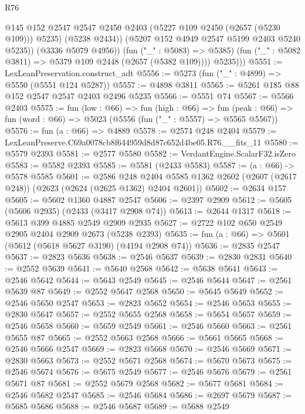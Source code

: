 \begin{lexlean}{R76}
\begin{coremodule}
                    @145
                    @152
                    @2547
                    @2547
                    @2450
                    @2403
                    (@5227 @109 @2450 (@2657 (@5230 @109)))
                    @5235)
                  (@5238 @2434))
                (@5207 @152 @4949 @2547 @5199 @2403 @5240 @5235))
              (@3336 @5079 @4956))
            (fun ("_" : @5083) => @5385)
            (fun ("_" : @5082 @3811) => @5379 @109 @2448 (@2657 (@5382 @109))))
          @5235)))
@5551 := LexLeanPreservation.construct_adt
@5556 := @5273 (fun ("_" : @4899) => @5550 (@5551 @124 @5287))
@5557 := @4898 @3811
@5565 := @5261 @185 @88 @152 @2547 @2547 @2403 @2496 @5235
@5566 := @5551 @74
@5567 := @5566 @2403
@5575 := fun (low : @66) =>
  fun (high : @66) =>
  fun (peak : @66) => fun (word : @66) => @5023 (@5556 (fun ("_" : @5557) => @5565 @5567))
@5576 := fun (a : @66) => @4889
@5578 := @2574 @248 @2404
@5579 := LexLeanPreserve.C69a0078cb8f644959d8d87c652d4be05.R76.__fits_11
@5580 := @5579 @2393
@5581 := @2577 @5580
@5582 := VerdantEngine.ScalarF32.isZero
@5583 := @5582 @2393
@5585 := @5581 (@2433 @5583)
@5587 := (a : @66) -> @5578 @5585
@5601 := @2586
    @248
    @2404
    @5585
    @1362
    @2602
    (@2607 (@2617 @248))
    (@2623 (@2624 (@2625 @1362) @2404 @2601))
@5602 := @2634 @157
@5605 := @5602 @1360 @4887 @2547
@5606 := @2397 @2909
@5612 := @5605 (@5606 @2935) (@2433 (@3417 @2908 @74))
@5613 := @2644 @1317
@5618 := @5613 @399 @4885 @2549 @2909 @2935
@5627 := @2722 @102 @650 @2549 @2905 @2404 @2909 @2673 (@5238 @2393)
@5635 := fun (a : @66) => @5601 (@5612 (@5618 @5627 @3190) (@4194 @2908 @74))
@5636 := @2835 @2547
@5637 := @2823 @5636
@5638 := @2546 @5637
@5639 := @2830 @2831
@5640 := @2552 @5639
@5641 := @5640 @2568
@5642 := @5638 @5641
@5643 := @2546 @5642
@5644 := @5643 @2549
@5645 := @2546 @5644
@5647 := @2561 @5639 @87
@5649 := @2552 @5647 @2568
@5650 := @5645 @5649
@5652 := @2546 @5650 @2547
@5653 := @2823 @5652
@5654 := @2546 @5653
@5655 := @2830 @5647
@5657 := @2552 @5655 @2568
@5658 := @5654 @5657
@5659 := @2546 @5658
@5660 := @5659 @2549
@5661 := @2546 @5660
@5663 := @2561 @5655 @87
@5665 := @2552 @5663 @2568
@5666 := @5661 @5665
@5668 := @2546 @5666 @2547
@5669 := @2823 @5668
@5670 := @2546 @5669
@5671 := @2830 @5663
@5673 := @2552 @5671 @2568
@5674 := @5670 @5673
@5675 := @2546 @5674
@5676 := @5675 @2549
@5677 := @2546 @5676
@5679 := @2561 @5671 @87
@5681 := @2552 @5679 @2568
@5682 := @5677 @5681
@5684 := @2546 @5682 @2547
@5685 := @2546 @5684
@5686 := @2697 @5679
@5687 := @5685 @5686
@5688 := @2546 @5687
@5689 := @5688 @2549

\end{coremodule}
\end{lexlean}

